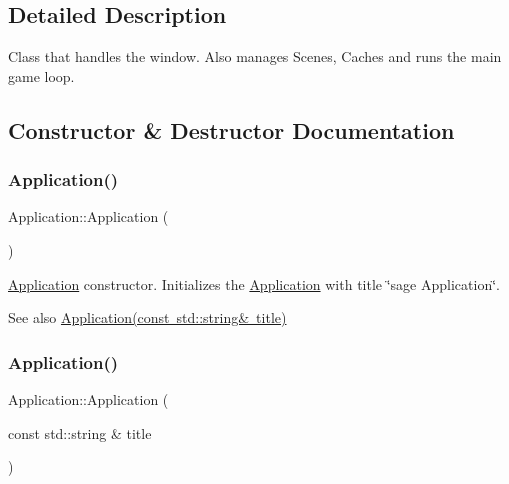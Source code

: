 \subsection{Detailed Description}
Class that handles the window. Also manages Scenes, Caches and runs the main game loop. 

\subsection{Constructor \& Destructor Documentation}
\mbox{\label{classsage_1_1Application_afa8cc05ce6b6092be5ecdfdae44e05f8}} 
\subsubsection{\texorpdfstring{Application()}{Application()}\hspace{0.1cm}{\footnotesize\ttfamily [1/3]}}
{\footnotesize\ttfamily Application\+::\+Application (\begin{DoxyParamCaption}{ }\end{DoxyParamCaption})}



\mbox{\hyperlink{classsage_1_1Application}{Application}} constructor. Initializes the \mbox{\hyperlink{classsage_1_1Application}{Application}} with title \char`\"{}sage Application\char`\"{}. 

\begin{DoxySeeAlso}{See also}
\mbox{\hyperlink{classsage_1_1Application_a357c8d817e692dae201b5b29148ad74d}{Application(const std\+::string\& title)}} 
\end{DoxySeeAlso}
\mbox{\label{classsage_1_1Application_a357c8d817e692dae201b5b29148ad74d}} 
\subsubsection{\texorpdfstring{Application()}{Application()}\hspace{0.1cm}{\footnotesize\ttfamily [2/3]}}
{\footnotesize\ttfamily Application\+::\+Application (\begin{DoxyParamCaption}\item[{const std\+::string \&}]{title }\end{DoxyParamCaption})}



